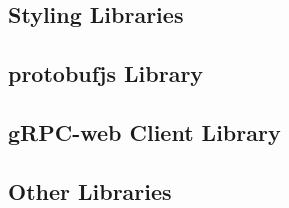 \subsection{Styling Libraries}

\subsection{protobufjs Library}

\subsection{gRPC-web Client Library}

\subsection{Other Libraries}
%
%
%


